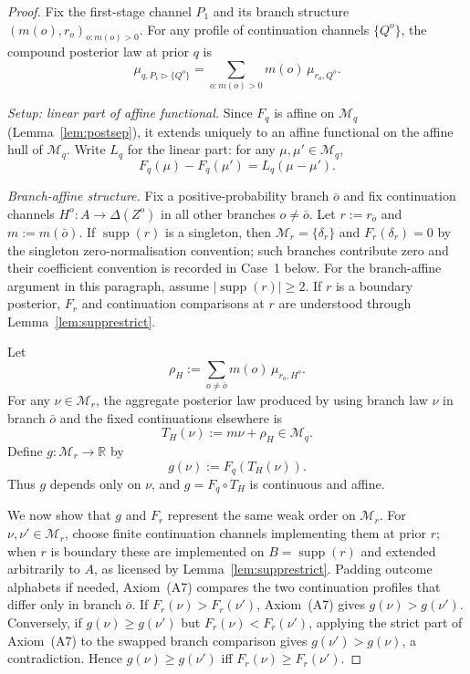 \documentclass[11pt,a4paper]{article}
\theoremstyle{definition}
\newcommand{\R}{\mathbb R}
\newcommand{\1}{\mathbf 1}
\begin{document}
\begin{proof}
Fix the first-stage channel $P_1$ and its branch structure $(m(o),r_o)_{o:m(o)>0}$.  For any profile of continuation
channels $\{Q^o\}$, the compound posterior law at prior $q$ is
\[
\mu_{q,P_1\triangleright\{Q^o\}}
=
\sum_{o:m(o)>0}m(o)\,\mu_{r_o,Q^o}.
\]

\emph{Setup: linear part of affine functional.}  Since $F_q$ is affine on $\mathcal M_q$ (Lemma~\ref{lem:postsep}),
it extends uniquely to an affine functional on the affine hull of $\mathcal M_q$.  Write $L_q$ for the linear part:
for any $\mu,\mu'\in\mathcal M_q$,
\[
F_q(\mu)-F_q(\mu')=L_q(\mu-\mu').
\]

\emph{Branch-affine structure.}  Fix a positive-probability branch $\bar o$ and fix continuation channels
$H^o:A\to\Delta(Z^o)$ in all other branches $o\ne\bar o$.  Let $r:=r_{\bar o}$ and $m:=m(\bar o)$.  If
$\operatorname{supp}(r)$ is a singleton, then $\mathcal M_r=\{\delta_r\}$ and $F_r(\delta_r)=0$ by the singleton
zero-normalisation convention; such branches contribute zero and their coefficient convention is recorded in
Case~1 below.  For the branch-affine argument in this paragraph, assume $|\operatorname{supp}(r)|\ge2$.  If $r$ is a
boundary posterior, $F_r$ and continuation comparisons at $r$ are understood through Lemma~\ref{lem:supprestrict}.

Let
\[
\rho_H:=\sum_{o\ne\bar o}m(o)\,\mu_{r_o,H^o}.
\]
For any $\nu\in\mathcal M_r$, the aggregate posterior law produced by using branch law $\nu$ in branch $\bar o$ and
the fixed continuations elsewhere is
\[
T_H(\nu):=m\nu+\rho_H\in\mathcal M_q.
\]
Define $g:\mathcal M_r\to\R$ by
\[
g(\nu):=F_q(T_H(\nu)).
\]
Thus $g$ depends only on $\nu$, and $g=F_q\circ T_H$ is continuous and affine.

We now show that $g$ and $F_r$ represent the same weak order on $\mathcal M_r$.  For $\nu,\nu'\in\mathcal M_r$, choose
finite continuation channels implementing them at prior $r$; when $r$ is boundary these are implemented on
$B=\operatorname{supp}(r)$ and extended arbitrarily to $A$, as licensed by Lemma~\ref{lem:supprestrict}.  Padding outcome
alphabets if needed, Axiom~\textup{(A7)} compares the two continuation profiles that differ only in branch $\bar o$.
If $F_r(\nu)>F_r(\nu')$, Axiom~\textup{(A7)} gives $g(\nu)>g(\nu')$.  Conversely, if $g(\nu)\ge g(\nu')$ but
$F_r(\nu)<F_r(\nu')$, applying the strict part of Axiom~\textup{(A7)} to the swapped branch comparison gives
$g(\nu')>g(\nu)$, a contradiction.  Hence $g(\nu)\ge g(\nu')$ iff $F_r(\nu)\ge F_r(\nu')$.


\end{proof}
\end{document}
